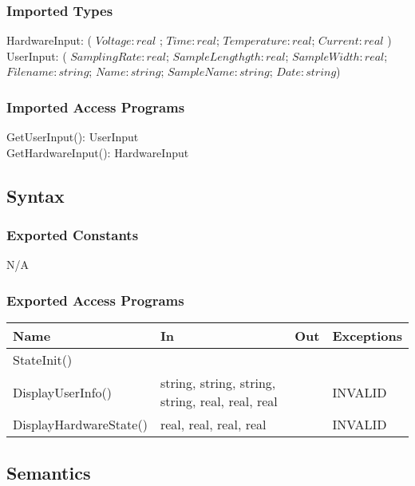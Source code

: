 \documentclass[12pt, titlepage]{article}
\begin{document}
\subsubsection{Imported Types}

HardwareInput: ( $Voltage: real $ ; $Time: real$; $Temperature: real$; $Current: real$ )\\
UserInput: ( $SamplingRate: real$; $SampleLengthgth: real$; $SampleWidth: real$; $Filename: string$; $Name: string$; $SampleName: string$; $Date: string$)

\subsubsection{Imported Access Programs}

GetUserInput(): UserInput\\
GetHardwareInput(): HardwareInput\\ 


\subsection{Syntax}

\subsubsection{Exported Constants}

N/A
\subsubsection{Exported Access Programs}

\begin{center}
\begin{tabular}{p{5cm} p{5cm} p{1cm} p{3cm}}
\hline
\textbf{Name} & \textbf{In} & \textbf{Out} & \textbf{Exceptions} \\
\hline
StateInit() & &  &  \\
DisplayUserInfo() & string, string, string, string, real, real, real &  & INVALID \\
DisplayHardwareState() & real, real, real, real&  & INVALID \\
\hline
\end{tabular}
\end{center}

\subsection{Semantics}
\end{document}
